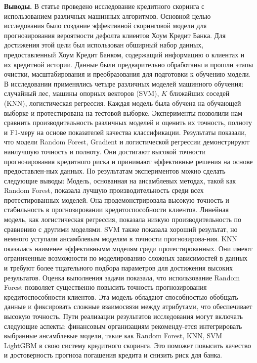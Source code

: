 \begin{multicols}{2}

{\bfseries Выводы.} В статье проведено исследование кредитного скоринга с
использованием различных машинных алгоритмов. Основной целью
исследования было создание эффективной скоринговой модели для
прогнозирования вероятности дефолта клиентов Хоум Кредит Банка. Для
достижения этой цели был использован обширный набор данных,
предоставленный Хоум Кредит Банком, содержащий информацию о клиентах и
\hspace{0pt}\hspace{0pt}их кредитной истории. Данные были предварительно
обработаны и прошли этапы очистки, масштабирования и преобразования для
подготовки к обучению модели. В исследовании применялись четыре
различных моделей машинного обучения: случайный лес, машины опорных
векторов (SVM), $K$ ближайших соседей
(KNN), логистическая регрессия. Каждая модель была обучена на обучающей
выборке и протестирована на тестовой выборке. Эксперименты позволили нам
сравнить производительность различных моделей и оценить их точность,
полноту и F1-меру на основе показателей качества классификации.
Результаты показали, что модели Random Forest, Gradient и логистической
регрессии демонстрируют наилучшую точность и полноту. Они достигают
высокой точности прогнозирования кредитного риска и принимают
эффективные решения на основе предоставлен-ных данных. По результатам
экспериментов можно сделать следующие выводы: Модель, основанная на
ансамблевых методах, такой как Random Forest, показала лучшую
производительность среди всех протестированных моделей. Она
продемонстрировала высокую точность и стабильность в прогнозировании
кредитоспособности клиентов. Линейная модель, как логистическая
регрессия, показала низкую производительность по сравнению с другими
моделями. SVM также показала хороший результат, но немного уступали
ансамблевым моделям в точности прогнозирова-ния. KNN оказалась наименее
эффективнымм моделям среди протестированных. Они имеют ограниченные
возможности по моделированию сложных зависимостей в данных и требуют
более тщательного подбора параметров для достижения высоких результатов.
Оценка выполнения задачи показала, что использование Random Forest
позволяет существенно повысить точность прогнозирования
кредитоспособности клиентов. Эта модель обладают способностью обобщать
данные и фиксировать сложные взаимосвязи между атрибутами, что
обеспечивает высокую точность. Пути реализации результатов исследования
могут включать следующие аспекты: финансовым организациям рекоменду-ется
интегрировать выбранные ансамблевые модели, такие как Random Forest,
KNN, SVM LightGBM в свою систему кредитного скоринга. Это поможет
повысить качество и достоверность прогноза погашения кредита и снизить
риск для банка.

\end{multicols}


